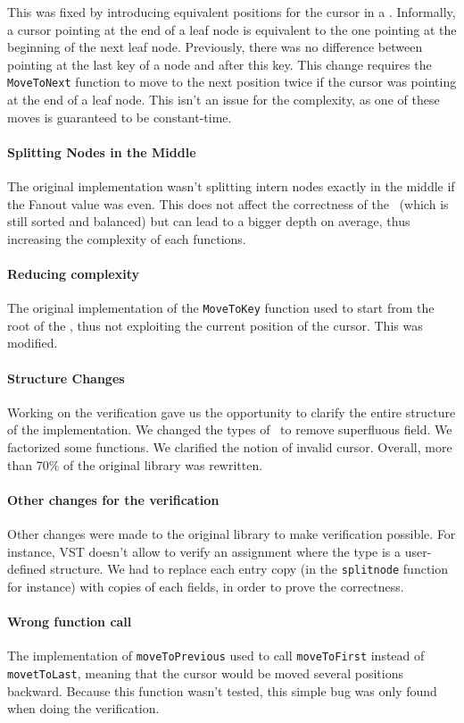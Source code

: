 This was fixed by introducing equivalent positions for the cursor in a \btree.
Informally, a cursor pointing at the end of a leaf node is equivalent to the one pointing at the beginning of the next leaf node.
Previously, there was no difference between pointing at the last key of a node and after this key.
This change requires the \lstinline{MoveToNext} function to move to the next position twice if the cursor was pointing at the end of a leaf node.
This isn't an issue for the complexity, as one of these moves is guaranteed to be constant-time.

\paragraph{Splitting Nodes in the Middle}
The original implementation wasn't splitting intern nodes exactly in the middle if the Fanout value was even.
This does not affect the correctness of the \btree\ (which is still sorted and balanced) but can lead to a bigger depth on average, thus increasing the complexity of each functions.

\paragraph{Reducing complexity}
The original implementation of the \lstinline{MoveToKey} function used to start from the root of the \btree, thus not exploiting the current position of the cursor. This was modified.

\paragraph{Structure Changes}
Working on the verification gave us the opportunity to clarify the entire structure of the implementation.
We changed the types of \btrees\ to remove superfluous field. We factorized some functions. We clarified the notion of invalid cursor.
Overall, more than 70\% of the original library was rewritten.

\paragraph{Other changes for the verification}
Other changes were made to the original library to make verification possible.
For instance, VST doesn't allow to verify an assignment where the type is a user-defined structure. 
We had to replace each entry copy (in the \lstinline{splitnode} function for instance) with copies of each fields, in order to prove the correctness.

\paragraph{Wrong function call} The implementation of \lstinline{moveToPrevious} used to call \lstinline{moveToFirst} instead of \lstinline{movetToLast}, meaning that the cursor would be moved several positions backward.
Because this function wasn't tested, this simple bug was only found when doing the verification.

